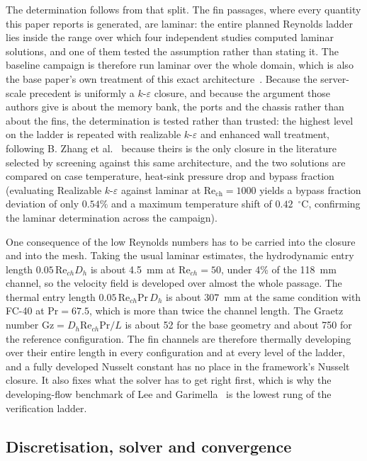 The determination follows from that split. The fin passages, where every quantity this paper
reports is generated, are laminar: the entire planned Reynolds ladder lies inside the range over
which four independent studies computed laminar solutions, and one of them tested the assumption
rather than stating it. The baseline campaign is therefore run laminar over the whole domain,
which is also the base paper's own treatment of this exact architecture~\cite{muneeshwaran2023}.
Because the server-scale precedent is uniformly a $k$-$\varepsilon$ closure, and because the
argument those authors give is about the memory bank, the ports and the chassis rather than about
the fins, the determination is tested rather than trusted: the highest level on the ladder is
repeated with realizable $k$-$\varepsilon$ and enhanced wall treatment, following B. Zhang et
al.~\cite{zhang2026} because theirs is the only closure in the literature selected by screening
against this same architecture, and the two solutions are compared on case temperature, heat-sink
pressure drop and bypass fraction (evaluating Realizable $k$-$\varepsilon$ against laminar at $\mathrm{Re}_{\mathrm{ch}} = 1000$ yields a bypass fraction deviation of only $0.54\%$ and a maximum temperature shift of $0.42$~$^{\circ}$C, confirming the laminar determination across the campaign).

One consequence of the low Reynolds numbers has to be carried into the closure and into the mesh.
Taking the usual laminar estimates, the hydrodynamic entry length $0.05\,\mathrm{Re}_{ch}D_h$ is
about 4.5~mm at $\mathrm{Re}_{ch}=50$, under 4\% of the 118~mm channel, so the velocity field is
developed over almost the whole passage. The thermal entry length
$0.05\,\mathrm{Re}_{ch}\mathrm{Pr}\,D_h$ is about 307~mm at the same condition with FC-40 at
$\mathrm{Pr}=67.5$, which is more than twice the channel length. The Graetz number
$\mathrm{Gz}=D_h\mathrm{Re}_{ch}\mathrm{Pr}/L$ is about 52 for the base geometry and about 750 for
the reference configuration. The fin channels are therefore thermally developing over their entire
length in every configuration and at every level of the ladder, and a fully developed Nusselt
constant has no place in the framework's Nusselt closure. It also fixes what the
solver has to get right first, which is why the developing-flow benchmark of Lee and
Garimella~\cite{lee2006} is the lowest rung of the verification ladder.

\subsection{Discretisation, solver and convergence}
\label{sec:discretisation}

